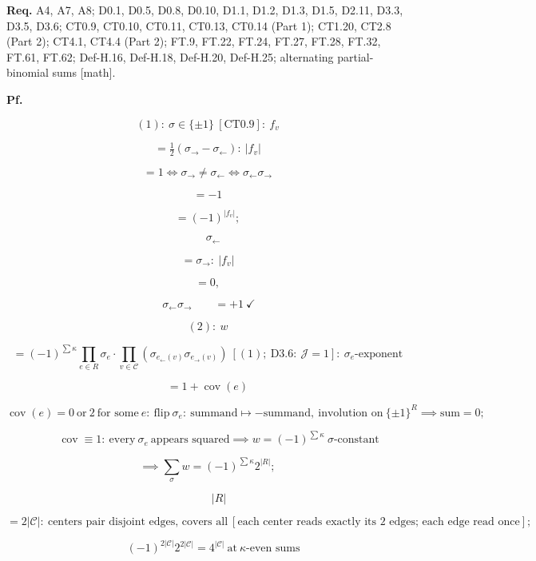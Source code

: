 \begin{theorem}
\textbf{Req.} A4, A7, A8; D0.1, D0.5, D0.8, D0.10, D1.1, D1.2, D1.3, D1.5, D2.11, D3.3, D3.5, D3.6; CT0.9, CT0.10, CT0.11, CT0.13, CT0.14 (Part 1); CT1.20, CT2.8 (Part 2); CT4.1, CT4.4 (Part 2); FT.9, FT.22, FT.24, FT.27, FT.28, FT.32, FT.61, FT.62; Def-H.16, Def-H.18, Def-H.20, Def-H.25; alternating partial-binomial sums [math].

\textbf{Pf.}

\[
(1):\ \sigma\in\{\pm1\}\ [\mathrm{CT0.9}]:\ f_v
\]

\[
= \tfrac12(\sigma_\rightarrow-\sigma_\leftarrow):\ |f_v|
\]

\[
= 1\iff\sigma_\rightarrow\ne\sigma_\leftarrow\iff\sigma_\leftarrow\sigma_\rightarrow
\]

\[
= -1
\]

\[
= (-1)^{|f_v|};
\]

\[
\quad\sigma_\leftarrow
\]

\[
= \sigma_\rightarrow:\ |f_v|
\]

\[
= 0,
\]

\[
\ \sigma_\leftarrow\sigma_\rightarrow\qquad = +1\ \checkmark
\]

\[
(2):\ w
\]

\[
= (-1)^{\sum\kappa}\prod_{e\in R}\sigma_e\cdot\!\!\prod_{v\in\mathcal C}\!\!(\sigma_{e_\leftarrow(v)}\sigma_{e_\rightarrow(v)})\ [(1);\ \mathrm{D3.6}:\ \mathcal J=1]:\ \sigma_e\text{-exponent}
\]

\[
= 1+\operatorname{cov}(e)
\]

\[
\operatorname{cov}(e)=0\ \text{or}\ 2\ \text{for some}\ e:\ \text{flip}\ \sigma_e:\ \text{summand}\mapsto-\text{summand},\ \text{involution on}\ \{\pm1\}^R\implies\text{sum}=0;
\]

\[
\qquad \operatorname{cov}\equiv1:\ \text{every}\ \sigma_e\ \text{appears squared}\implies w=(-1)^{\sum\kappa}\ \sigma\text{-constant}
\]

\[
\implies\sum_\sigma w=(-1)^{\sum\kappa}2^{|R|};
\]

\[
\qquad |R|
\]

\[
= 2|\mathcal C|:\ \text{centers pair disjoint edges, covers all}\ [\text{each center reads exactly its 2 edges; each edge read once}];
\]

\[
\quad (-1)^{2|\mathcal C|}2^{2|\mathcal C|}=4^{|\mathcal C|}\ \text{at}\ \kappa\text{-even sums}
\]


\end{theorem}

